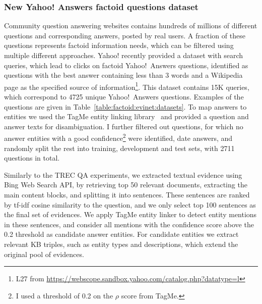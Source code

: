 \subsubsection{New Yahoo! Answers factoid questions dataset}
\label{section:factoid:evinet:eval:yahoo}

Community question answering websites contains hundreds of millions of different questions and corresponding answers, posted by real users.
A fraction of these questions represents factoid information needs, which can be filtered using multiple different approaches.
Yahoo! recently provided a dataset with search queries, which lead to clicks on factoid Yahoo!~Answers questions, identified as questions with the best answer containing less than 3 words and a Wikipedia page as the specified source of information\footnote{L27 from \href{url}{https://webscope.sandbox.yahoo.com/catalog.php?datatype=l}}.
This dataset contains 15K queries, which correspond to 4725 unique Yahoo!~Answers questions.
Examples of the questions are given in Table~\ref{table:factoid:evinet:datasets}.
To map answers to entities we used the TagMe entity linking library~\cite{ferragina2010tagme} and provided a question and answer texts for disambiguation.
I further filtered out questions, for which no answer entities with a good confidence\footnote{I used a threshold of 0.2 on the $\rho$ score from TagMe.} were identified, \eg date answers, and randomly split the rest into training, development and test sets, with 2711 questions in total.

Similarly to the TREC QA experiments, we extracted textual evidence using Bing Web Search API, by retrieving top 50 relevant documents, extracting the main content blocks, and splitting it into sentences.
These sentences are ranked by tf-idf cosine similarity to the question, and we only select top 100 sentences as the final set of evidences.
We apply TagMe entity linker to detect entity mentions in these sentences, and consider all mentions with the confidence score above the 0.2 threshold as candidate answer entities.
For candidate entities we extract relevant KB triples, such as entity types and descriptions, which extend the original pool of evidences.

